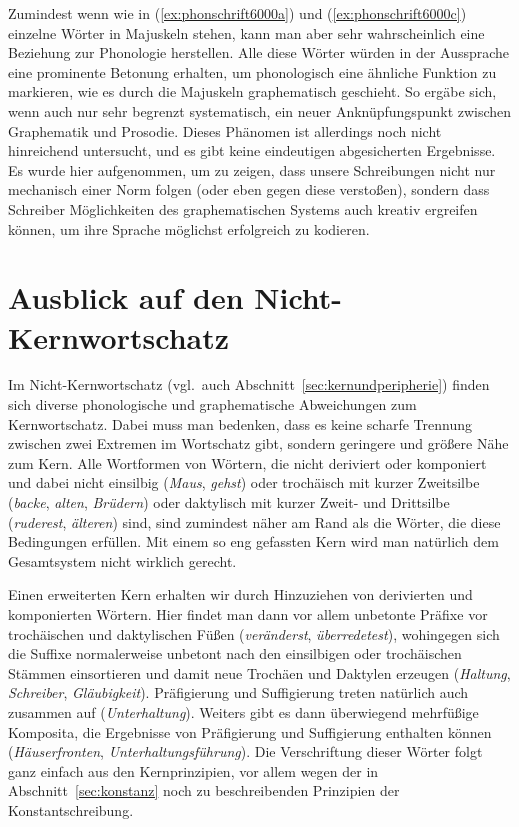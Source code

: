 Zumindest wenn wie in (\ref{ex:phonschrift6000a}) und (\ref{ex:phonschrift6000c}) einzelne Wörter in Majuskeln stehen, kann man aber sehr wahrscheinlich eine Beziehung zur Phonologie herstellen.
Alle diese Wörter würden in der Aussprache eine prominente Betonung erhalten, um phonologisch eine ähnliche Funktion zu markieren, wie es durch die Majuskeln graphematisch geschieht.
So ergäbe sich, wenn auch nur sehr begrenzt systematisch, ein neuer Anknüpfungspunkt zwischen Graphematik und Prosodie.
Dieses Phänomen ist allerdings noch nicht hinreichend untersucht, und es gibt keine eindeutigen abgesicherten Ergebnisse.
Es wurde hier aufgenommen, um zu zeigen, dass unsere Schreibungen nicht nur mechanisch einer Norm folgen (oder eben gegen diese verstoßen), sondern dass Schreiber Möglichkeiten des graphematischen Systems auch kreativ ergreifen können, um ihre Sprache möglichst erfolgreich zu kodieren.

\section{Ausblick auf den Nicht-Kernwortschatz}

\label{sec:nichtkernschreib}

Im Nicht-Kernwortschatz (vgl.\ auch Abschnitt~\ref{sec:kernundperipherie}) finden sich diverse phonologische und graphematische Abweichungen zum Kernwortschatz.
Dabei muss man bedenken, dass es keine scharfe Trennung zwischen zwei Extremen im Wortschatz gibt, sondern geringere und größere Nähe zum Kern.
Alle Wortformen von Wörtern, die nicht deriviert oder komponiert und dabei nicht einsilbig (\textit{Maus}, \textit{gehst}) oder trochäisch mit kurzer Zweitsilbe (\textit{backe}, \textit{alten}, \textit{Brüdern}) oder daktylisch mit kurzer Zweit- und Drittsilbe (\textit{ruderest}, \textit{älteren}) sind, sind zumindest näher am Rand als die Wörter, die diese Bedingungen erfüllen.
Mit einem so eng gefassten Kern wird man natürlich dem Gesamtsystem nicht wirklich gerecht.

Einen erweiterten Kern erhalten wir durch Hinzuziehen von derivierten und komponierten Wörtern.
Hier findet man dann vor allem unbetonte Präfixe vor trochäischen und daktylischen Füßen (\textit{veränderst}, \textit{überredetest}), wohingegen sich die Suffixe normalerweise unbetont nach den einsilbigen oder trochäischen Stämmen einsortieren und damit neue Trochäen und Daktylen erzeugen (\textit{Haltung}, \textit{Schreiber}, \textit{Gläubigkeit}).
Präfigierung und Suffigierung treten natürlich auch zusammen auf (\textit{Unterhaltung}).
Weiters gibt es dann überwiegend mehrfüßige Komposita, die Ergebnisse von Präfigierung und Suffigierung enthalten können (\textit{Häuserfronten}, \textit{Unterhaltungsführung}).
Die Verschriftung dieser Wörter folgt ganz einfach aus den Kernprinzipien, vor allem wegen der in Abschnitt~\ref{sec:konstanz} noch zu beschreibenden Prinzipien der Konstantschreibung.


